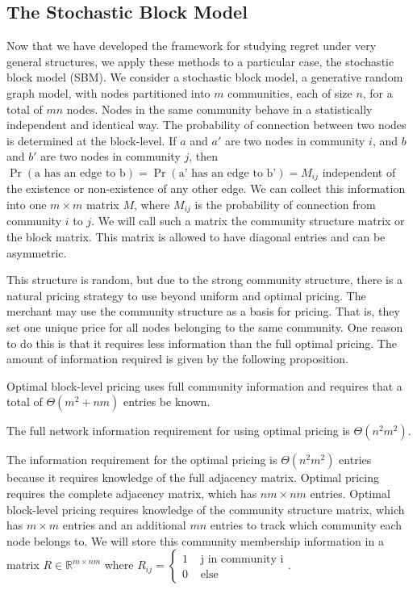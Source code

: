 \subsection{The Stochastic Block Model}
Now that we have developed the framework for studying regret under very general structures, we apply these methods to a particular case, the stochastic block model (SBM).  We consider a stochastic block model, a generative random graph model, with nodes partitioned into $m$ communities, each of size $n$, for a total of $mn$ nodes. Nodes in the same community behave in a statistically independent and identical way. The probability of connection between two nodes is determined at the block-level. If $a$ and $a'$ are two nodes in community $i$, and $b$ and $b'$ are two nodes in community $j$, then $\Pr(\text{a has an edge to b}) = \Pr(\text{a' has an edge to b'}) = M_{ij}$ independent of the existence or non-existence of any other edge. We can collect this information into one $m \times m$ matrix $M$, where $M_{ij}$  is the probability of connection from community $i$ to $j$. We will call such a matrix the community structure matrix or the block matrix. This matrix is allowed to have diagonal entries and can be asymmetric.  


This structure is random, but due to the strong community structure, there is a natural pricing strategy to use beyond uniform and optimal pricing. The merchant may use the community structure as a basis for pricing. That is, they set one unique price for all nodes belonging to the same community. One reason to do this is that it requires less information than the full optimal pricing. The amount of information required is given by the following proposition. 
\begin{proposition}
        Optimal block-level pricing uses full community information and requires that a total of  $\Theta ( m^2 + nm )$ entries be known. 
    
    The full network information requirement for using optimal pricing is $\Theta( n^2 m^2 )$.
\end{proposition}

The information requirement for the optimal pricing is $\Theta(n^2 m^2)$ entries because it requires knowledge of the full adjacency matrix. Optimal pricing requires the complete adjacency matrix, which has $nm \times nm$ entries. Optimal block-level pricing requires knowledge of the community structure matrix, which has $m \times m$ entries and an additional $mn$ entries to track which community each node belongs to. We will store this community membership information in a matrix $R \in \mathbb{R}^{m \times nm}$ where $R_{ij} = \begin{cases} 1 & \text{ j in community i} \\ 0 & \text{ else} \end{cases} $.

